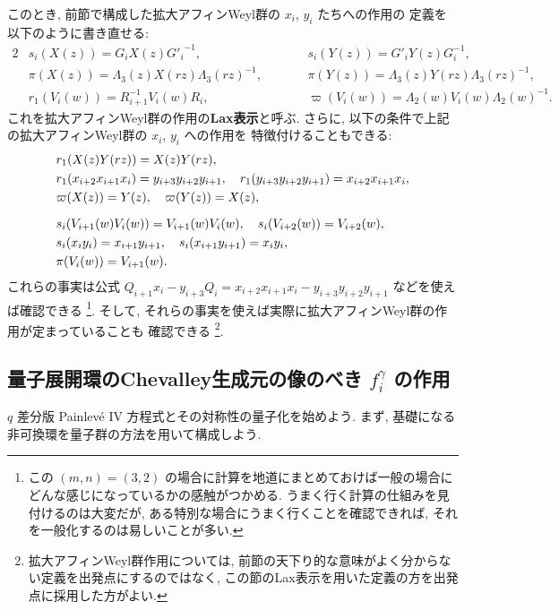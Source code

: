 \documentclass[12pt,twoside,dvipdfm]{msjproc}
\theoremstyle{definition} %
\theoremstyle{definition} %
\theoremstyle{definition} %
\numberwithin{theorem}{section}
\numberwithin{equation}{section}
\numberwithin{figure}{section}
\numberwithin{table}{section}
\begin{document}
このとき, 前節で構成した拡大アフィンWeyl群の $x_i$, $y_i$ たちへの作用の
定義を以下のように書き直せる:
\begin{alignat*}{2}
 &
 s_i(X(z)) = G_i X(z) {G'_i}^{-1}, \qquad
 & & 
 s_i(Y(z)) = G'_i Y(z) G_i^{-1},
 \\ &
 \pi(X(z)) = \Lambda_3(z) X(rz) \Lambda_3(rz)^{-1}, \qquad
 & &
 \pi(Y(z)) = \Lambda_3(z) Y(rz) \Lambda_3(rz)^{-1},
 \\ &
 r_1(V_i(w)) = R_{i+1}^{-1} V_i(w) R_i,  \qquad
 & & 
 \varpi(V_i(w)) = \Lambda_2(w) V_i(w) \Lambda_2(w)^{-1}.
\end{alignat*}
これを拡大アフィンWeyl群の作用の{\bf Lax表示}と呼ぶ.
さらに, 以下の条件で上記の拡大アフィンWeyl群の $x_i$, $y_i$ への作用を
特徴付けることもできる:
\begin{align*}
 &
 r_1(X(z)Y(rz)) = X(z)Y(rz), 
 \\ &
 r_1(x_{i+2}x_{i+1}x_i) = y_{i+3}y_{i+2}y_{i+1}, \quad
 r_1(y_{i+3}y_{i+2}y_{i+1}) = x_{i+2}x_{i+1}x_i,
 \\ &
 \varpi(X(z)) = Y(z), \quad
 \varpi(Y(z)) = X(z),
 \\[\medskipamount] &
 s_i(V_{i+1}(w)V_i(w)) = V_{i+1}(w)V_i(w), \quad
 s_i(V_{i+2}(w))=V_{i+2}(w),
 \\ &
 s_i(x_i y_i) = x_{i+1}y_{i+1}, \quad 
 s_i(x_{i+1}y_{i+1})= x_i y_i,
 \\ &
 \pi(V_i(w)) = V_{i+1}(w).
\end{align*}
これらの事実は公式 \(
 Q_{i+1}x_i - y_{i+3}Q_i = x_{i+2}x_{i+1}x_i - y_{i+3}y_{i+2}y_{i+1}
\) などを使えば確認できる%
\footnote{この $(m,n)=(3,2)$ の場合に計算を地道にまとめておけば一般の場合に
どんな感じになっているかの感触がつかめる. 
うまく行く計算の仕組みを見付けるのは大変だが, 
ある特別な場合にうまく行くことを確認できれば, それを一般化するのは易しいことが多い.}.
そして, それらの事実を使えば実際に拡大アフィンWeyl群の作用が定まっていることも
確認できる%
\footnote{拡大アフィンWeyl群作用については, 
前節の天下り的な意味がよく分からない定義を出発点にするのではなく, 
この節のLax表示を用いた定義の方を出発点に採用した方がよい.}.



\subsection{量子展開環のChevalley生成元の像のべき $f_i^\gamma$ の作用}
\label{sec:f^gamma}

$q$ 差分版 Painlev\'e IV 方程式とその対称性の量子化を始めよう.
まず, 基礎になる非可換環を量子群の方法を用いて構成しよう.
\end{document}
